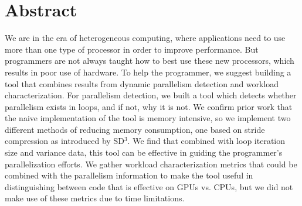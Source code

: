 \documentclass[12pt,twoside]{reedthesis}
\begin{document}
    \tableofcontents
    \listoftables
    \listoffigures

    \chapter*{Abstract}
	
	We are in the era of heterogeneous computing, where applications need to use more than one type of processor in order to improve performance. But programmers are not always taught how to best use these new processors, which results in poor use of hardware. To help the programmer, we suggest building a tool that combines results from dynamic parallelism detection and workload characterization. For parallelism detection, we built a tool which detects whether parallelism exists in loops, and if not, why it is not. We confirm prior work that the naive implementation of the tool is memory intensive, so we implement two different methods of reducing memory consumption, one based on stride compression as introduced by SD$^3$. We find that combined with loop iteration size and variance data, this tool can be effective in guiding the programmer's parallelization efforts. %
	We gather workload characterization metrics that could be combined with the parallelism information to make the tool useful in distinguishing between code that is effective on GPUs vs. CPUs, but we did not make use of these metrics due to time limitations. 
	

	


  \mainmatter %
  \pagestyle{fancyplain} %


\end{document}

